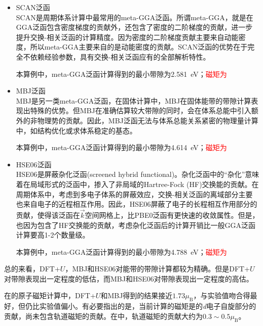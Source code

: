 {{\begin{itemize}
本算例中，原子的参数$U=8.00~\mathrm{eV}$和$J=0.95~\mathrm{eV}$，计算得到的最小带隙为3.438~\textrm{eV}；\textcolor{red}{磁矩为}

\item \textrm{SCAN}泛函\\
	\textrm{SCAN}是周期体系计算中最常用的\textrm{meta-GGA}泛函。所谓\textrm{meta-GGA}，就是在\textrm{GGA}泛函包含密度梯度的贡献外，还包含了密度的二阶梯度的贡献，进一步提升交换-相关泛函的计算精度。因为密度的二阶梯度贡献主要来自动能密度，所以\textrm{meta-GGA}主要来自的是动能密度的贡献。\textrm{SCAN}泛函的优势在于完全不依赖经验参数，具有交换-相关泛函应有的全部解析特性。

	本算例中，\textrm{meta-GGA}泛函计算得到的最小带隙为2.581~\textrm{eV}；\textcolor{red}{磁矩为}

\item \textrm{MBJ}泛函\\
	\textrm{MBJ}是另一类\textrm{meta-GGA}泛函，在固体计算中，\textrm{MBJ}在固体能带的带隙计算表现出特殊的优势。但\textrm{MBJ}在准确估算较大带隙的同时，会在体系总能中引入额外的非物理势的贡献。因此，\textrm{MBJ}泛函无法与体系总能关系紧密的物理量计算中，如结构优化或求体系稳定的基态。

	本算例中，\textrm{meta-GGA}泛函计算得到的最小带隙为4.614~\textrm{eV}；\textcolor{red}{磁矩为}

\item \textrm{HSE06}泛函\\
	\textrm{HSE06}是屏蔽杂化泛函\textrm{(screened hybrid functional)}。杂化泛函中的``杂化''意味着在局域形式的泛函中，掺入了非局域的\textrm{Hartree-Fock (HF)}交换能的贡献。在周期体系中，考虑到多电子体系的屏蔽效应，交换-相关泛函的离域部分主要也来自电子的近程相互作用。因此，\textrm{HSE06}屏蔽了电子的长程相互作用部分的贡献，使得该泛函在$\vec k$空间网格上，比\textrm{PBE0}泛函有更快速的收敛属性。但是，也因为包含了\textrm{HF}交换能的贡献，考虑杂化泛函后的计算开销比一般\textrm{GGA}泛函计算要高1-2个数量级。

	本算例中，\textrm{meta-GGA}泛函计算得到的最小带隙为4.788~\textrm{eV}；\textcolor{red}{磁矩为}
\end{itemize}
总的来看，\textrm{DFT+}$U$，\textrm{MBJ}和\textrm{HSE06}对能带的带隙计算都较为精确。但是\textrm{DFT+}$U$对带隙表现出一定程度的低估，而\textrm{MBJ}和\textrm{HSE06}对带隙表现出一定程度的高估。

在的原子磁矩计算中，\textrm{DFT+}$U$和\textrm{MBJ}得到的结果接近$1.73\mu_{\mathrm{B}}$，与实验值吻合得最好，但仍比实验值偏小。有必要指出的是，当前计算的磁矩是的\textit{d}电子自旋部分的贡献，尚未包含轨道磁矩的贡献。在中，轨道磁矩的贡献大约为$0.3\sim0.5\mu_{\mathrm{B}}$。

}}
